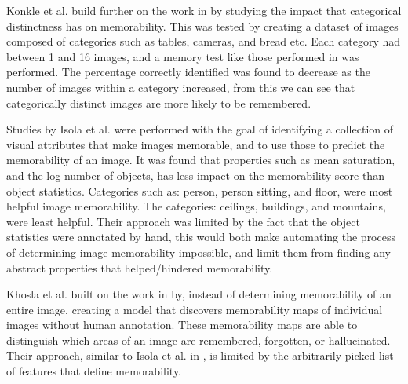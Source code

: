 \documentclass{UoYCSproject}
\begin{document}

Konkle et al. build further on the work in \cite{standing10000pictures, brady2008visual} by studying the impact that categorical distinctness has on memorability. This was tested by creating a dataset of images composed of categories such as tables, cameras, and bread etc. Each category had between 1 and 16 images, and a memory test like those performed in \cite{standing10000pictures, brady2008visual}
was performed. The percentage correctly identified was found to decrease as the number of images within a category increased, from this we can see that categorically distinct images are more likely to be remembered. 

Studies by Isola et al. \cite{Isola2011, IsolaParikhTorralbaOliva2011} were performed with the goal of identifying a collection of visual attributes that make images memorable, and to use those to predict the memorability of an image. It was found that properties such as mean saturation, and the log number of objects, has less impact on the memorability score than object statistics. 
Categories such as: person, person sitting, and floor, were most helpful image memorability. The categories: ceilings, buildings, and mountains, were least helpful. Their approach was limited by the fact that the object statistics were annotated by hand, this would both make automating the process of determining image memorability impossible, and limit them from finding any abstract properties that helped/hindered memorability.

Khosla et al. \cite{NIPS12_Khosla} built on the work in \cite{Isola2011, IsolaParikhTorralbaOliva2011} by, instead of determining memorability of an entire image, creating a model that discovers memorability maps of individual images without human annotation. These memorability maps are able to distinguish which areas of an image are remembered, forgotten, or hallucinated. Their approach, similar to Isola et al. in \cite{Isola2011, IsolaParikhTorralbaOliva2011}, is limited by the arbitrarily picked list of features that define memorability.
\end{document}
